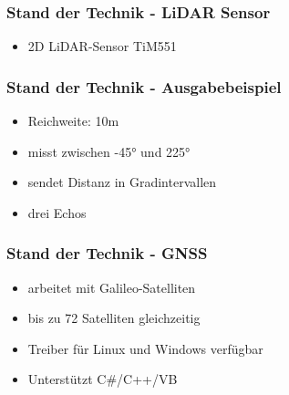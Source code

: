\documentclass{beamer}
\begin{document}
\begin{frame}
\frametitle{Stand der Technik - LiDAR Sensor}
\begin{itemize}
\item<1-> 2D LiDAR-Sensor TiM551
\end{itemize}
\end{frame}

\begin{frame}
\frametitle{Stand der Technik - Ausgabebeispiel}
\begin{itemize}
\item<1-> Reichweite: 10m 
\item<2-> misst zwischen -45° und 225°
\item<3-> sendet Distanz in Gradintervallen
\item<4> drei Echos
\end{itemize}
\end{frame}

\begin{frame}
\frametitle{Stand der Technik - GNSS}
\begin{itemize}
\item<1-> arbeitet mit Galileo-Satelliten
\item<2-> bis zu 72 Satelliten gleichzeitig
\item<3-> Treiber für Linux und Windows verfügbar
\item<4> Unterstützt C\#/C++/VB
\end{itemize}
\end{frame}
\end{document}
